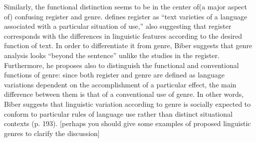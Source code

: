 \documentclass[12pt]{turabian-researchpaper}
\begin{document}
Similarly, the functional distinction seems to be in the center of(a major aspect of) confusing register and genre. \textcite[p. 191]{biber2012} defines register as ``text varieties of a language associated with a particular situation of use,'' also suggesting that register corresponds with the differences in linguistic features according to the desired function of text. In order to differentiate it from genre, Biber suggests that genre analysis looks ``beyond the sentence'' unlike the studies in the register. Furthermore, he proposes also to distinguish the functional and conventional functions of genre: since both register and genre are defined as language variations dependent on the accomplishment of a particular effect, the main difference between them is that of a conventional use of genre. In other words, Biber suggests that linguistic variation according to genre is socially expected to conform to particular rules of language use rather than distinct situational contexts (p. 193). [perhaps you should give some examples of proposed linguistic genres to clarify the discussion]
\end{document}

